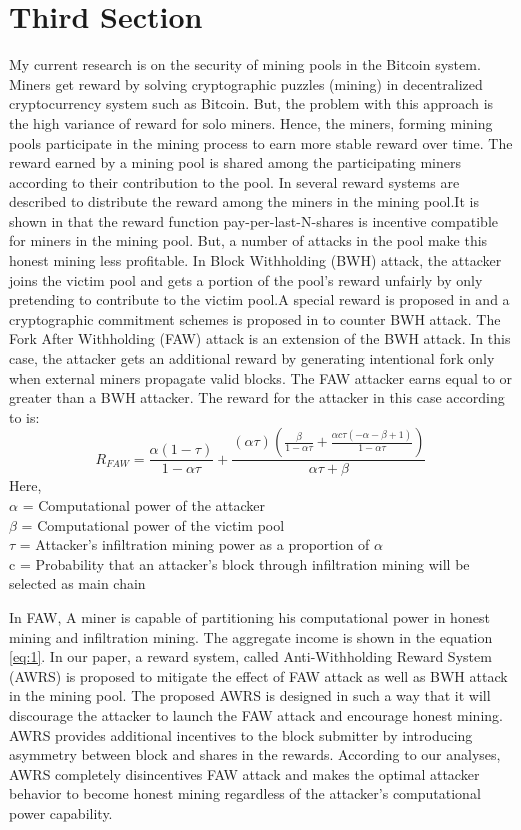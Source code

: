 \documentclass[conference]{IEEEtran}
\begin{document}
\section{Third Section}
My current research is on the security of mining pools in the Bitcoin system. Miners get reward by solving cryptographic puzzles (mining) in decentralized cryptocurrency system such as Bitcoin. But, the problem with this approach is the high variance of reward for solo miners. Hence, the miners, forming mining pools participate in the mining process to earn more stable reward over time. The reward earned by a mining pool is shared among the participating miners according to their contribution to the pool. In \cite{rosenfeld2011analysis} several reward systems are described to distribute the reward among the miners in the mining pool.It is shown in \cite{schrijvers2016incentive} that the reward function pay-per-last-N-shares is incentive compatible for miners in the mining pool. But, a number of attacks in the pool make this honest mining less profitable. In Block Withholding (BWH) attack, the attacker joins the victim pool and gets a portion of the pool’s reward unfairly by only pretending to contribute to the victim pool.A special reward is proposed in \cite{bag2016yet} and a cryptographic commitment schemes is proposed in \cite{bag2017bitcoin} to counter BWH attack. The Fork After Withholding (FAW) attack is an extension of the BWH attack. In this case, the attacker gets an additional reward by generating intentional fork only when external miners propagate valid blocks. The FAW attacker earns equal to or greater than a BWH attacker. The reward for the attacker in this case according to \cite{kwon2017selfish} is:
\begin{equation} \label{eq:1}
R_{FAW}=\frac{\alpha  (1-\tau )}{1-\alpha  \tau }+\frac{(\alpha  \tau ) \left(\frac{\beta }{1-\alpha  \tau }+\frac{\alpha  c \tau  (-\alpha -\beta +1)}{1-\alpha  \tau }\right)}{\alpha  \tau +\beta }
\end{equation}
Here, \\
$\alpha$ = Computational power of the attacker \\
$\beta$ = Computational power of the victim pool \\
$\tau$ = Attacker’s infiltration mining power as a proportion of $\alpha$ \\
c = Probability that an attacker’s block through infiltration mining will be selected as main chain 

In FAW, A miner is capable of partitioning his computational power in honest mining and infiltration mining. The aggregate income is shown in the equation \ref{eq:1}.  
In our paper, a reward system, called Anti-Withholding Reward System (AWRS) is proposed to mitigate the effect of FAW attack as well as BWH attack in the mining pool. The proposed AWRS is designed in such a way that it will discourage the attacker to launch the FAW attack and encourage honest mining. AWRS provides additional incentives to the block submitter by introducing asymmetry between block and shares in the rewards. According to our analyses, AWRS completely disincentives FAW attack and makes the optimal attacker behavior to become honest mining regardless of the attacker's computational power capability.



\end{document}
